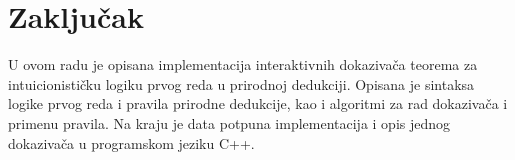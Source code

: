 \documentclass[a4paper,10pt]{article}
\theoremstyle{remark}
\begin{document}
\section{Zaključak}
\label{sec:zakljucak}

U ovom radu je opisana implementacija interaktivnih dokazivača teorema za
intuicionističku logiku prvog reda u prirodnoj dedukciji.
Opisana je sintaksa logike prvog reda i pravila prirodne dedukcije, kao i
algoritmi za rad dokazivača i primenu pravila.
Na kraju je data potpuna implementacija i opis jednog dokazivača u programskom
jeziku C++.

\printbibliography
\end{document}

